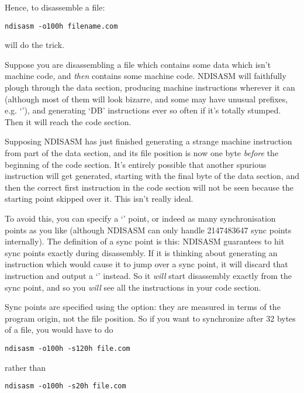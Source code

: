 Hence, to disassemble a  file:

\begin{lstlisting}
ndisasm -o100h filename.com
\end{lstlisting}

will do the trick.


Suppose you are disassembling a file which contains some data which
isn't machine code, and \emph{then} contains some machine code. NDISASM
will faithfully plough through the data section, producing machine
instructions wherever it can (although most of them will look
bizarre, and some may have unusual prefixes, e.g. `'),
and generating `DB' instructions ever so often if it's totally stumped.
Then it will reach the code section.

Supposing NDISASM has just finished generating a strange machine
instruction from part of the data section, and its file position is
now one byte \emph{before} the beginning of the code section. It's
entirely possible that another spurious instruction will get
generated, starting with the final byte of the data section, and
then the correct first instruction in the code section will not be
seen because the starting point skipped over it. This isn't really
ideal.

To avoid this, you can specify a `' point, or indeed
as many synchronisation points as you like (although NDISASM can
only handle 2147483647 sync points internally). The definition of a sync
point is this: NDISASM guarantees to hit sync points exactly during
disassembly. If it is thinking about generating an instruction which
would cause it to jump over a sync point, it will discard that
instruction and output a `' instead. So it \emph{will} start
disassembly exactly from the sync point, and so you \emph{will} see all
the instructions in your code section.

Sync points are specified using the  option: they are measured
in terms of the program origin, not the file position. So if you
want to synchronize after 32 bytes of a  file, you would have to
do

\begin{lstlisting}
ndisasm -o100h -s120h file.com
\end{lstlisting}

rather than

\begin{lstlisting}
ndisasm -o100h -s20h file.com
\end{lstlisting}

